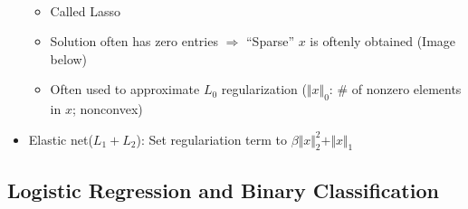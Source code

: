 \begin{itemize}
\begin{equation}
\begin{aligned}
    \end{aligned}\end{equation}
    \begin{itemize}
        \item Called Lasso
        \item Solution often has zero entries $\Rightarrow$ ``Sparse'' $x$ is oftenly obtained (Image below)
        \item Often used to approximate $L_0$ regularization ($\Vert x\Vert_0$: \# of nonzero elements in $x$; nonconvex)
    \end{itemize}
    \begin{figures}
    \end{figures}
    \item Elastic net($L_1+L_2$): Set regulariation term to $\beta\Vert x\Vert_2^2+\Vert x\Vert_1$
\end{itemize}

\subsection{Logistic Regression and Binary Classification}

